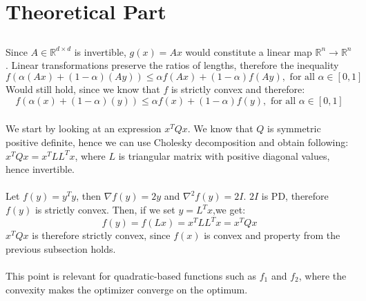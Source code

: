 \documentclass[a4paper]{article}
\begin{document}

\section{Theoretical Part}
\subsection{}
\subsubsection{}
Since $A \in \mathbb{R}^{d\times d}$ is invertible, $g(x) = Ax$ would constitute a linear map
$\mathbb{R}^n \rightarrow \mathbb{R}^n$. Linear transformations preserve the
ratios of lengths, therefore the inequality
\[
f(\alpha(A x)+(1-\alpha)(A y)) \leq \alpha f(A x)+(1-\alpha) f(A y), \text { for all } \alpha \in[0,1]
\]
Would still hold, since we know that $f$ is strictly convex and therefore:
\[
f(\alpha(x)+(1-\alpha)(y)) \leq \alpha f(x)+(1-\alpha) f(y), \text { for all } \alpha \in[0,1]
\]
\subsubsection{}
We start by looking at an expression $x^TQx$. We know that $Q$ is symmetric
positive definite, hence we can use Cholesky decomposition and obtain following:
$x^TQx = x^TLL^Tx$, where $L$ is triangular matrix with positive diagonal
values, hence invertible.\\\\
Let $f(y) = y^Ty$, then $\nabla f(y) = 2y$ and $\nabla^2 f(y) = 2I$. $2I$ is
PD, therefore $f(y)$ is strictly convex. Then, if we set $y=L^Tx$,we get:
\[
f(y) = f(Lx) = x^TLL^Tx = x^TQx
\]
$x^TQx$ is therefore strictly convex, since $f(x)$ is convex and 
property from the previous subsection holds. \\\\
This point is relevant for quadratic-based functions such as $f_1$ and $f_2$,
where the convexity makes the optimizer converge on the optimum.

\subsection{}
\end{document}
